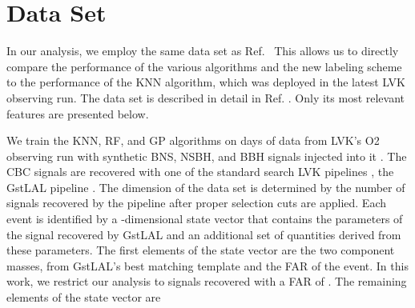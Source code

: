 \section{Data Set} \label{dataset}

In our analysis, we employ the same data set as Ref.~\cite{Chatterjee:2019avs} This allows us to directly compare the performance of the various algorithms and the new labeling
scheme to the performance of the \ac{KNN} algorithm, which was deployed in the latest \ac{LVK} observing run. The data set is described in detail in Ref.  . Only its most relevant features are presented below.

We train the \ac{KNN}, \ac{RF}, and \ac{GP} algorithms on  days of data  from \ac{LVK}'s \ac{O2} observing run with  synthetic \ac{BNS}, \ac{NSBH}, and \ac{BBH} signals
injected into it .  The \ac{CBC} signals are recovered with one of the standard search \ac{LVK} pipelines , the GstLAL
pipeline .  The dimension of the data set is determined by the number of signals recovered by the pipeline after
proper selection cuts are applied. Each event is identified by a -dimensional state vector that contains the parameters of the signal recovered by GstLAL and an additional set of
quantities derived from these parameters. The first  elements of the state vector are the two component masses,  from GstLAL's best matching
template and the \ac{FAR} of the event. In this work, we restrict our analysis to signals recovered with a \ac{FAR} of .  The remaining elements of the state
vector are  



